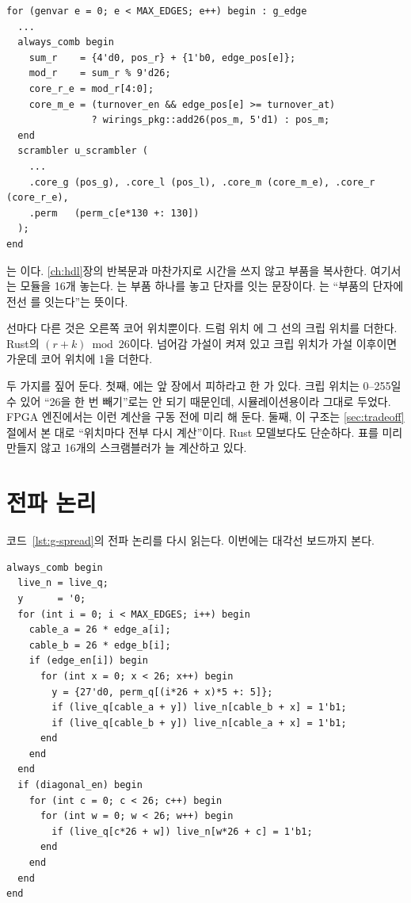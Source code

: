 \begin{lstlisting}[language=SV,caption={\code{bombe\_core.sv}: 선마다 스크램블러 하나(일부).}]
for (genvar e = 0; e < MAX_EDGES; e++) begin : g_edge
  ...
  always_comb begin
    sum_r    = {4'd0, pos_r} + {1'b0, edge_pos[e]};
    mod_r    = sum_r % 9'd26;
    core_r_e = mod_r[4:0];
    core_m_e = (turnover_en && edge_pos[e] >= turnover_at)
               ? wirings_pkg::add26(pos_m, 5'd1) : pos_m;
  end
  scrambler u_scrambler (
    ...
    .core_g (pos_g), .core_l (pos_l), .core_m (core_m_e), .core_r (core_r_e),
    .perm   (perm_c[e*130 +: 130])
  );
end
\end{lstlisting}

는 이다. \ref{ch:hdl}장의 반복문과 마찬가지로 시간을
쓰지 않고 부품을 복사한다. 여기서는  모듈을 16개 놓는다. 는
부품 하나를 놓고 단자를 잇는 문장이다. 는 ``부품의  단자에 전선
를 잇는다''는 뜻이다.

선마다 다른 것은 오른쪽 코어 위치뿐이다. 드럼 위치 에 그 선의 크립 위치를 더한다. Rust의
$(r + k) \bmod 26$이다. 넘어감 가설이 켜져 있고 크립 위치가 가설 이후이면 가운데 코어 위치에 1을 더한다.

두 가지를 짚어 둔다. 첫째, 에는 앞 장에서 피하라고 한 \code{\%}가 있다. 크립 위치는
0--255일 수 있어 ``26을 한 번 빼기''로는 안 되기 때문인데, 시뮬레이션용이라 그대로 두었다. FPGA 엔진에서는
이런 계산을 구동 전에 미리 해 둔다. 둘째, 이 구조는 \ref{sec:tradeoff}절에서 본 대로 ``위치마다 전부 다시
계산''이다. Rust 모델보다도 단순하다. 표를 미리 만들지 않고 16개의 스크램블러가 늘 계산하고 있다.

\section{전파 논리}

코드~\ref{lst:g-spread}의 전파 논리를 다시 읽는다. 이번에는 대각선 보드까지 본다.

\begin{lstlisting}[language=SV,caption={\code{bombe\_core.sv}: 한 걸음 퍼뜨리기.},label={lst:spread-full}]
always_comb begin
  live_n = live_q;
  y      = '0;
  for (int i = 0; i < MAX_EDGES; i++) begin
    cable_a = 26 * edge_a[i];
    cable_b = 26 * edge_b[i];
    if (edge_en[i]) begin
      for (int x = 0; x < 26; x++) begin
        y = {27'd0, perm_q[(i*26 + x)*5 +: 5]};
        if (live_q[cable_a + y]) live_n[cable_b + x] = 1'b1;
        if (live_q[cable_b + y]) live_n[cable_a + x] = 1'b1;
      end
    end
  end
  if (diagonal_en) begin
    for (int c = 0; c < 26; c++) begin
      for (int w = 0; w < 26; w++) begin
        if (live_q[c*26 + w]) live_n[w*26 + c] = 1'b1;
      end
    end
  end
end
\end{lstlisting}

